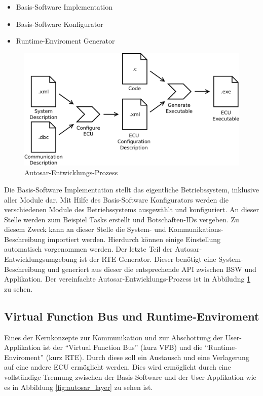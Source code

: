 \documentclass[
  a4paper,					    %
  twoside,
  DIV=calc,     				%
  bibliography=totoc,
  cleardoublepage=empty,
  ngerman,     					%
  final       					%
]{scrbook}
\begin{document}
\begin{itemize}
    \item Basis-Software Implementation
    \item Basis-Software Konfigurator
    \item Runtime-Enviroment Generator
\end{itemize}

\begin{figure}[h]
    \centering
    \includegraphics[width=1\textwidth]{Autosar_Prozess.png}
    \caption{Autosar-Entwicklungs-Prozess}
    \label{fig:autosar_prozess}
\end{figure}

Die Basis-Software Implementation stellt das eigentliche Betriebssystem, inklusive aller Module dar. Mit Hilfe des Basis-Software Konfigurators werden die verschiedenen Module des Betriebssystems ausgewählt und konfiguriert. An dieser Stelle werden zum Beispiel Tasks erstellt und Botschaften-IDs vergeben. Zu diesem Zweck kann an dieser Stelle die System- und Kommunikations-Beschreibung importiert werden. Hierdurch können einige Einstellung automatisch vorgenommen werden. Der letzte Teil der Autosar-Entwicklungsumgebung ist der RTE-Generator. Dieser benötigt eine System-Beschreibung und generiert aus dieser die entsprechende API zwischen BSW und Applikation. Der vereinfachte Autosar-Entwicklungs-Prozess ist in Abbiludng \ref{fig:autosar_prozess} zu sehen.



\subsection{Virtual Function Bus und Runtime-Enviroment}
\label{sec:vfb}
Eines der Kernkonzepte zur Kommunikation und zur Abschottung der User-Applikation ist der "`Virtual Function Bus"' (kurz VFB) und die "`Runtime-Enviroment"' (kurz RTE). Durch diese soll ein Austausch und eine Verlagerung auf eine andere ECU ermöglicht werden. Dies wird ermöglicht durch eine vollständige Trennung zwischen der Basis-Software und der User-Applikation wie es in Abbildung \ref{fig:autosar_layer} zu sehen ist. 
\end{document}
